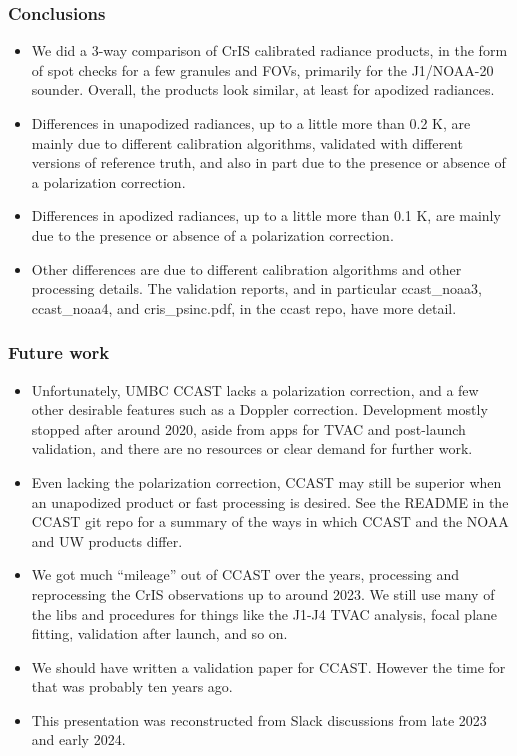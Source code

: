 \documentclass[9pt]{beamer}
\begin{document}
\begin{frame}
\frametitle{Conclusions}
\begin{itemize}

  \item We did a 3-way comparison of CrIS calibrated radiance
    products, in the form of spot checks for a few granules and
    FOVs, primarily for the J1/NOAA-20 sounder.  Overall, the
    products look similar, at least for apodized radiances.

  \item Differences in unapodized radiances, up to a little more
    than 0.2 K, are mainly due to different calibration algorithms,
    validated with different versions of reference truth, and also
    in part due to the presence or absence of a polarization
    correction.

  \item Differences in apodized radiances, up to a little more than
    0.1 K, are mainly due to the presence or absence of a
    polarization correction.

  \item Other differences are due to different calibration
    algorithms and other processing details.  The validation
    reports, and in particular ccast\_noaa3, ccast\_noaa4, and
    cris\_psinc.pdf, in the ccast repo, have more detail.

\end{itemize}
\end{frame}
\begin{frame}
\frametitle{Future work}
\begin{itemize}

  \item Unfortunately, UMBC CCAST lacks a polarization correction,
    and a few other desirable features such as a Doppler correction.
    Development mostly stopped after around 2020, aside from apps
    for TVAC and post-launch validation, and there are no resources
    or clear demand for further work.
  
  \item Even lacking the polarization correction, CCAST may still be
    superior when an unapodized product or fast processing is
    desired.  See the README in the CCAST git repo for a summary of
    the ways in which CCAST and the NOAA and UW products differ.

  \item We got much ``mileage'' out of CCAST over the years,
    processing and reprocessing the CrIS observations up to around
    2023.  We still use many of the libs and procedures for things
    like the J1-J4 TVAC analysis, focal plane fitting, validation
    after launch, and so on.

  \item We should have written a validation paper for CCAST.
    However the time for that was probably ten years ago.

  \item This presentation was reconstructed from Slack discussions
    from late 2023 and early 2024.

\end{itemize}
\end{frame}
\end{document}
